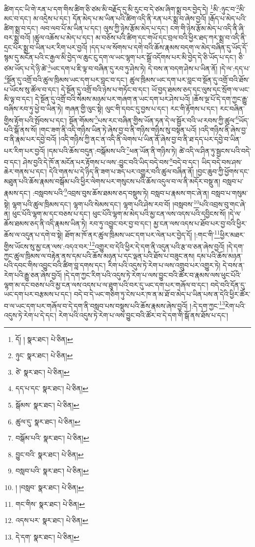 ཚིག་དང་ཡི་གེ་རན་པ་དག་གིས་ཚིག་ཅི་ཙམ་མི་བརྗོད་དུ་མི་རུང་བ་དེ་ཙམ་ཞིག་སྨྲ་བར་བྱེད་དེ། \footnote{དོ། །   སྣར་ཐང་།  པེ་ཅིན། }མི་:ཉུང་བ་\footnote{ཉུང་  སྣར་ཐང་།  པེ་ཅིན། }མི་མང་བ་དང་། མ་འདྲེས་པ་དང་། དོན་མེད་པ་མ་ཡིན་པའི་ཚིག་འདི་ནི་རན་པར་སྨྲ་བ་ཞེས་བྱའོ། །རྒོད་པ་མེད་པའི་ཚིག་སྨྲ་བ་དང་། ལབ་ལབ་པོ་མ་ཡིན་པ་དང་། ལུས་ཀྱི་ཉེས་རྩོམ་མེད་པ་དང་། ངག་གི་ཉེས་རྩོམ་མེད་པ་འདི་ནི་ཞི་བར་སྨྲ་བའོ། །ཚུལ་འཆོས་པ་མེད་པ་དང་། མ་བཅོས་པའི་ཚིག་དང་གཡོ་དང་བྲལ་བའི་ཕྱིར་ཐད་ཀར་སྨྲ་བ་འདི་ནི་དྲང་པོར་སྨྲ་བ་ཡིན་པར་རིག་པར་བྱའོ། །དད་པ་ལ་སོགས་པ་དགེ་བའི་ཆོས་རྣམས་བདག་ལ་མེད་བཞིན་དུ་ཡོད་དོ་སྙམ་དུ་མངོན་པའི་ང་རྒྱལ་མི་བྱེད་ལ་ཆུང་ངུ་དག་ལ་ཡང་ལྷག་པར་སྒྲོ་འདོགས་པར་མི་བྱེད་དེ་ཅི་ཡོད་པ་དང་། ཅི་ཙམ་ཡོད་པ་དེ་ཉི་ཚེ་\footnote{ཙེ་  སྣར་ཐང་།  པེ་ཅིན། }ཡང་དག་པ་ཇི་ལྟ་བ་བཞིན་དུ་རབ་ཏུ་ཤེས་ཏེ། དེ་བས་ན་བདག་ཤེས་པ་ཡིན་ནོ། །དེ་ལ་:དད་པ་\footnote{དད་པ་དང་  སྣར་ཐང་།  པེ་ཅིན། }སྔོན་དུ་འགྲོ་བའི་ཚུལ་ཁྲིམས་ཡང་དག་པར་བླང་བ་དང་། ཚུལ་ཁྲིམས་ཡང་དག་པར་བླང་བ་སྔོན་དུ་འགྲོ་བའི་ཐོས་པ་ཡོངས་སུ་ཚོལ་བ་དང་། དེ་སྔོན་དུ་འགྲོ་བའི་ཉེས་པ་གཏོང་བ་དང་། ཡོ་བྱད་ཐམས་ཅད་དང་ལུས་དང་སྲོག་ལ་ཡང་མི་ལྟ་བ་དང་། དེ་སྔོན་དུ་འགྲོ་བའི་སེམས་མཉམ་པར་གཞག་ན་ཡང་དག་པར་ཤེས་པའོ། །ཆོས་ལྔ་པོ་དེ་དག་ཀྱང་རྒྱུ་བཞིས་རབ་ཏུ་ཕྱེ་བ་ཡིན་ཏེ། གཞན་གྱི་ལུང་སྟེ། ལུང་གི་དབང་དུ་བྱས་པ་དང་། རང་གི་རྟོགས་པ་དང་། རང་བཞིན་གྱིས་རྟོག་པའི་སྤོབས་པ་དང་། སྔོན་གོམས་\footnote{སྒོམས་  སྣར་ཐང་།  པེ་ཅིན། }པས་རང་བཞིན་གྱིས་ཡོན་ཏན་དེ་ལ་སྦྱོར་བའི་ཡ་རབས་ཀྱི་ཚུལ་\footnote{ཚུལ་དུ་  སྣར་ཐང་།  པེ་ཅིན། }ཡོད་པའི་སྒོ་ནས་སོ། །གང་ཟག་ནི་འདི་གཉིས་ཡིན་ཏེ་ཞེས་བྱ་བ་ནི་གཉིས་གཉིས་སུ་བསྟན་པའོ། །འདི་གཉིས་ནི་ཞེས་བྱ་བ་ནི་རྣམ་པར་དབྱེ་བའོ། །འདི་གཉིས་ཀྱི་ནང་ན་འདི་ནི་ལེགས་པ་ཡིན་ནོ་ཞེས་བྱ་བ་ནི་ཐ་དད་པར་དབྱེ་བ་ཡིན་པར་རིག་པར་བྱའོ། །དམ་པའི་ཆོས་བདུན་:བསྒོམས་པའི་\footnote{བསྒོམ་པའི་  སྣར་ཐང་།  པེ་ཅིན། }ཕན་ཡོན་ནི་གཉིས་ཏེ། ཚེ་འདི་ལ་ཤིན་ཏུ་སྦྱངས་པའི་བདེ་བ་དང་། ཤེས་བྱའི་དེ་ཁོ་ན་མངོན་པར་རྟོགས་པ་ལས་:བྱུང་བའི་ཡིད་བདེ་བས་\footnote{བྱུང་བའི་  སྣར་ཐང་།  པེ་ཅིན། }བདེ་བ་དང་། ཡིད་བདེ་བས་ཤས་ཆེར་གནས་པ་དང་། དེའི་གནས་པ་དེ་ཉིད་ནི་ཟག་པ་ཟད་པར་འགྱུར་བའི་ཚུལ་བཞིན་ནོ། །བྱང་ཆུབ་ཀྱི་ཕྱོགས་དང་མཐུན་པའི་ཆོས་རྣམས་བསྒོམ་པའི་ཕྱིར་ལེགས་པར་གསུངས་པའི་ཆོས་འདུལ་བ་ལ་ནི་མདོར་བསྡུ་ན། བསླབ་པ་རྣམས་དང་། :བསླབས་པའི་\footnote{བསླབ་པའི་  སྣར་ཐང་།  པེ་ཅིན། }འབྲས་བུས་ཆོས་ཐམས་ཅད་བསྡུས་ཏེ། བསླབ་པ་རྣམས་གང་ཞེ་ན། བསླབ་པ་གསུམ་སྟེ། ལྷག་པའི་ཚུལ་ཁྲིམས་དང་། ལྷག་པའི་སེམས་དང་། ལྷག་པའི་ཤེས་རབ་བོ། །བསླབས་\footnote{། །བསླབ་  སྣར་ཐང་།  པེ་ཅིན། }པའི་འབྲས་བུ་གང་ཞེ་ན། ཕུང་པོའི་ལྷག་མ་དང་བཅས་པ་དང་། ཕུང་པོའི་ལྷག་མ་མེད་པའི་མྱ་ངན་ལས་འདས་པའི་དབྱིངས་སོ། །དེ་ལ་ཆོས་ཐམས་ཅད་ནི་འདི་རྣམས་ཡིན་ཏེ། རབ་ཏུ་འབྱུང་བར་བྱ་བ་དང་། མྱ་ངན་ལས་འདས་པ་ཐོབ་པར་བྱ་བའི་ཕྱིར་ཆོས་ལ་འདུན་པ་དགེ་བ་སྟེ། ཐོག་མ་ཁོ་ནར་ཚུལ་ཁྲིམས་ཡང་དག་པར་ལེན་པར་བྱེད་དོ། །:གང་གི་\footnote{གང་གིས་  སྣར་ཐང་།  པེ་ཅིན། }ཕྱིར་མཐར་གྱིས་ཡོངས་སུ་མྱ་ངན་ལས་:འདའ་བར་\footnote{འདས་པར་  སྣར་ཐང་།  པེ་ཅིན། }འགྱུར་བ་དེའི་ཕྱིར་དེ་དག་ནི་འདུན་པའི་རྩ་བ་ཅན་ཞེས་བྱའོ། །དེ་དག་ཀྱང་ཚུལ་ཁྲིམས་ལ་བརྟེན་ནས་དམ་པའི་ཆོས་མཉན་པ་དང་ལྡན་པའི་ཐོས་པ་བཟུང་ནས། དམ་པའི་ཆོས་མཉན་པའི་དབང་གིས་འབྱུང་བའི་ཚིག་བླ་དགས་དང་། རིག་པའི་འདུས་ཏེ་རེག་པ་ལས་འགྲུབ་པར་འགྱུར་ཏེ། དེ་བས་ན་རེག་པའི་རྒྱུ་ཅན་ཞེས་བྱའོ། །དེ་དག་ཀྱང་རིག་པའི་འདུས་ཏེ་རེག་པ་ལས་བྱུང་བའི་ཚོར་བ་རྣམས་ལས་ཕུང་པོའི་ལྷག་མ་དང་བཅས་པའི་མྱ་ངན་ལས་འདས་པ་ལ་ཐུག་པའི་བར་དུ་ཡང་དག་པར་གཞོལ་བ་དང་། བདེ་བའི་དོན་དུ་ཡང་དག་པར་བརྩམས་པ་དང་། བདེ་བ་དེ་ཡང་གཅིག་ཏུ་ངེས་པར་ཁ་ན་མ་ཐོ་བ་མེད་པ་ཡིན་པས་ན་དེའི་ཕྱིར་ཚོར་བ་ལ་ཡང་དག་པར་གཞོལ་བ་དེ་དག་ནི་བསླབ་པས་བསྡུས་པའི་ཆོས་རྣམས་ཞེས་བྱའོ། །:དེ་དག་ཀྱང་\footnote{དེ་དག་  སྣར་ཐང་།  པེ་ཅིན། }རེག་པའི་འདུས་ཏེ་རེག་པ་དེ་དང་། རེག་པའི་འདུས་ཏེ་རེག་པ་ལས་བྱུང་བའི་ཚོར་བ་དེ་དག་གི་སྒོ་ནས་ཐོས་པ་དང་། 